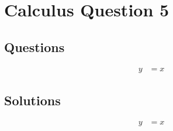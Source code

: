 \chapter{Calculus Question 5}
\label{chap:cq5}

\section{Questions}
\label{sec:cq5q}
\begin{align}
  y &= x
\end{align}

\section{Solutions}
\label{sec:cq5s}
\begin{align}
  y &= x
\end{align}